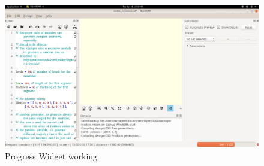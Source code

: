 \begin{figure}
	\centering
	\includegraphics[width=\linewidth]{images/output/progress_widget.png}
	\caption{Progress Widget working}
\end{figure}
